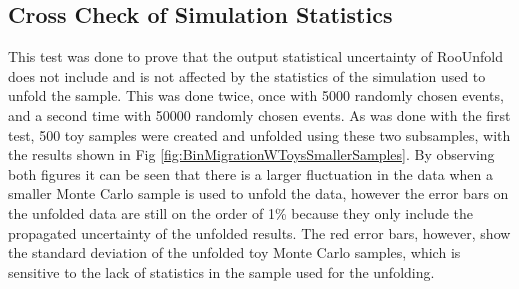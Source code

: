 \subsection{Cross Check of Simulation Statistics}
This test was done to prove that the output statistical uncertainty of RooUnfold does not include and is not affected by the statistics of the simulation used to unfold the sample.  This was done twice, once with 5000 randomly chosen \POWHEG events, and a second time with 50000 randomly chosen events. As was done with the first test, 500 toy samples were created and unfolded using these two subsamples, with the results shown in Fig \ref{fig:BinMigrationWToysSmallerSamples}. By observing both figures it can be seen that there is a larger fluctuation in the data when a smaller Monte Carlo sample is used to unfold the data, however the error bars on the unfolded data are still on the order of 1\% because they only include the propagated uncertainty of the unfolded results. The red error bars, however, show the standard deviation of the unfolded toy Monte Carlo samples, which is sensitive to the lack of statistics in the sample used for the unfolding. 

